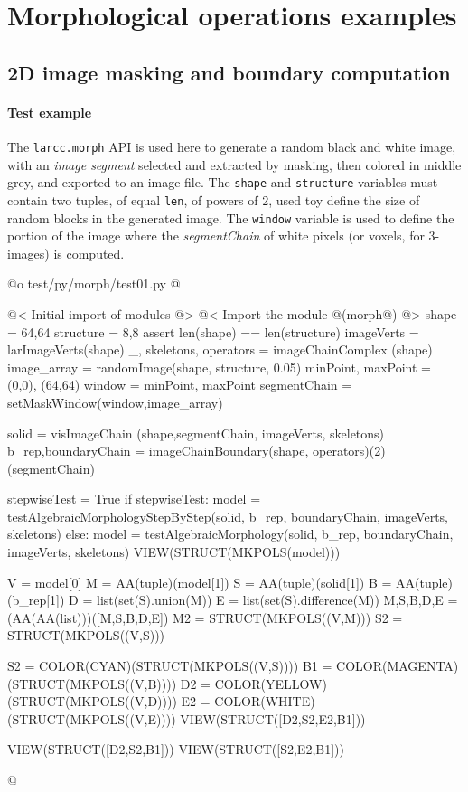 \documentclass[11pt,oneside]{article}	%
\begin{document}
\section{Morphological operations examples}

\subsection{2D image masking and boundary computation}

\paragraph{Test example}

The \texttt{larcc.morph} API is used here to generate a random black and white image, with an \emph{image segment} selected and extracted by masking, then colored in middle grey, and exported to an image file.  
The \texttt{shape} and \texttt{structure} variables must contain two tuples, of equal \texttt{len}, of powers of 2, used toy define the size of random blocks in the generated image. The \texttt{window} variable is used to define the portion of the image where the \emph{segmentChain} of white pixels (or voxels, for 3-images) is computed.

@o test/py/morph/test01.py
@{
@< Initial import of modules @>
@< Import the module @(morph@) @> 
shape = 64,64
structure = 8,8
assert len(shape) == len(structure)
imageVerts = larImageVerts(shape)
_, skeletons, operators = imageChainComplex (shape)
image_array = randomImage(shape, structure, 0.05)
minPoint, maxPoint = (0,0), (64,64)
window = minPoint, maxPoint
segmentChain = setMaskWindow(window,image_array)
	
solid = visImageChain (shape,segmentChain, imageVerts, skeletons)
b_rep,boundaryChain = imageChainBoundary(shape, operators)(2)(segmentChain)

stepwiseTest = True
if stepwiseTest:
	model = testAlgebraicMorphologyStepByStep(solid, b_rep, 
				boundaryChain, imageVerts, skeletons)
else:
	model = testAlgebraicMorphology(solid, b_rep, 
				boundaryChain, imageVerts, skeletons)
VIEW(STRUCT(MKPOLS(model)))

V = model[0]
M = AA(tuple)(model[1])
S = AA(tuple)(solid[1])
B = AA(tuple)(b_rep[1])
D = list(set(S).union(M))
E = list(set(S).difference(M))
M,S,B,D,E = (AA(AA(list)))([M,S,B,D,E])
M2 = STRUCT(MKPOLS((V,M)))
S2 = STRUCT(MKPOLS((V,S)))

S2 = COLOR(CYAN)(STRUCT(MKPOLS((V,S))))
B1 = COLOR(MAGENTA)(STRUCT(MKPOLS((V,B))))
D2 = COLOR(YELLOW)(STRUCT(MKPOLS((V,D))))
E2 = COLOR(WHITE)(STRUCT(MKPOLS((V,E))))
VIEW(STRUCT([D2,S2,E2,B1]))

VIEW(STRUCT([D2,S2,B1]))
VIEW(STRUCT([S2,E2,B1]))

@}
\end{document}
